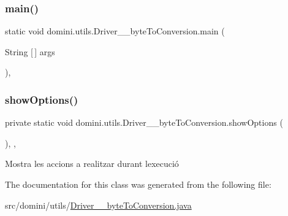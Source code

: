\subsubsection{\texorpdfstring{main()}{main()}}
{\footnotesize\ttfamily static void domini.\+utils.\+Driver\+\_\+\+\_\+byte\+To\+Conversion.\+main (\begin{DoxyParamCaption}\item[{String \mbox{[}$\,$\mbox{]}}]{args }\end{DoxyParamCaption})\hspace{0.3cm}{\ttfamily [inline]}, {\ttfamily [static]}}

\mbox{\label{classdomini_1_1utils_1_1Driver____byteToConversion_a58412c0a63cc729003ca6d28bbc3b83b}} 
\subsubsection{\texorpdfstring{show\+Options()}{showOptions()}}
{\footnotesize\ttfamily private static void domini.\+utils.\+Driver\+\_\+\+\_\+byte\+To\+Conversion.\+show\+Options (\begin{DoxyParamCaption}{ }\end{DoxyParamCaption})\hspace{0.3cm}{\ttfamily [inline]}, {\ttfamily [static]}, {\ttfamily [private]}}



Mostra les accions a realitzar durant l\textquotesingle{}execució 



The documentation for this class was generated from the following file\+:\begin{DoxyCompactItemize}
\item 
src/domini/utils/\hyperlink{Driver____byteToConversion_8java}{Driver\+\_\+\+\_\+byte\+To\+Conversion.\+java}\end{DoxyCompactItemize}
